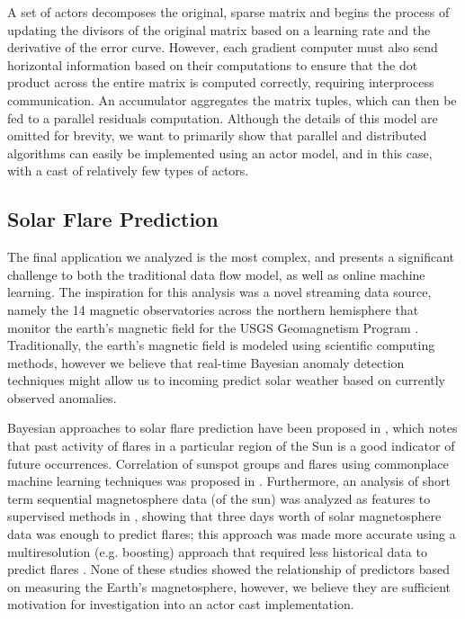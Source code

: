\documentclass[conference,twocolumn,10pt]{IEEEtran}
\begin{document}
A set of actors decomposes the original, sparse matrix and begins the process of updating the divisors of the original matrix based on a learning rate and the derivative of the error curve. However, each gradient computer must also send horizontal information based on their computations to ensure that the dot product across the entire matrix is computed correctly, requiring interprocess communication. An accumulator aggregates the matrix tuples, which can then be fed to a parallel residuals computation. Although the details of this model are omitted for brevity, we want to primarily show that parallel and distributed algorithms can easily be implemented using an actor model, and in this case, with a cast of relatively few types of actors.

\subsection{Solar Flare Prediction}

The final application we analyzed is the most complex, and presents a significant challenge to both the traditional data flow model, as well as online machine learning. The inspiration for this analysis was a novel streaming data source, namely the 14 magnetic observatories across the northern hemisphere that monitor the earth's magnetic field for the USGS Geomagnetism Program \cite{love_usgs_2011}. Traditionally, the earth's magnetic field is modeled using scientific computing methods, however we believe that real-time Bayesian anomaly detection techniques \cite{hill_real-time_2007} might allow us to incoming predict solar weather based on currently observed anomalies.

Bayesian approaches to solar flare prediction have been proposed in \cite{wheatland_bayesian_2004}, which notes that past activity of flares in a particular region of the Sun is a good indicator of future occurrences. Correlation of sunspot groups and flares using commonplace machine learning techniques was proposed in \cite{qahwaji_automatic_2007}. Furthermore, an analysis of short term sequential magnetosphere data (of the sun) was analyzed as features to supervised methods in \cite{yu_short-term_2009}, showing that three days worth of solar magnetosphere data was enough to predict flares; this approach was made more accurate using a multiresolution (e.g. boosting) approach that required less historical data to predict flares \cite{yu_short-term_2010}. None of these studies showed the relationship of predictors based on measuring the Earth's magnetosphere, however, we believe they are sufficient motivation for investigation into an actor cast implementation.
\end{document}
